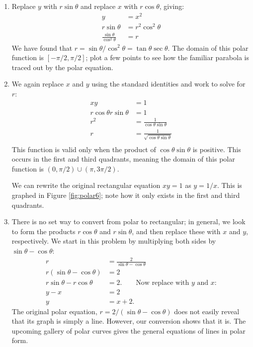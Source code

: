 {\begin{enumerate}
	\item Replace $y$ with $r\sin\theta$ and replace $x$ with $r\cos\theta$, giving:
	\begin{align*}
	y &=x^2\\
	r\sin\theta &= r^2\cos^2\theta\\
	\frac{\sin\theta}{\cos^2\theta} &= r
	\end{align*}
	We have found that $r=\sin\theta/\cos^2\theta = \tan\theta\sec\theta$. The domain of this polar function is $[-\pi/2,\pi/2]$; plot a few points to see how the familiar parabola is traced out by the polar equation.
	\item		We again replace $x$ and $y$ using the standard identities and work to solve for $r$:
	\begin{align*}
	xy &= 1 \\
	r\cos\theta r\sin\theta & = 1\\
	r^2 & = \frac{1}{\cos\theta\sin\theta}\\
	r & = \frac{1}{\sqrt{\cos\theta\sin\theta}}\\
	\end{align*}
	This function is valid only when the product of $\cos\theta\sin\theta$ is positive. This occurs in the first and third quadrants, meaning the domain of this polar function is $(0,\pi/2) \cup (\pi,3\pi/2)$.
	
	We can rewrite the original rectangular equation $xy=1$ as $y=1/x$. This is graphed in Figure \ref{fig:polar6}; note how it only exists in the first and third quadrants.
		
	\item		There is no set way to convert from polar to rectangular; in general, we look to form the products $r\cos \theta$ and $r\sin\theta$, and then replace these with $x$ and $y$, respectively. We start in this problem by multiplying both sides by $\sin\theta-\cos\theta$:
	\begin{align*}
	r &= \frac{2}{\sin\theta-\cos\theta} \\
	r(\sin\theta-\cos\theta) &= 2\\
	r\sin\theta-r\cos\theta &= 2. \qquad \text{Now replace with $y$ and $x$:}\\
	y-x &= 2\\
	y &= x+2.
	\end{align*}
	The original polar equation, $r=2/(\sin\theta-\cos\theta)$ does not easily reveal that its graph is simply a line. However, our conversion shows that it is. The upcoming gallery of polar curves gives the general equations of lines in polar form.


\end{enumerate}}
